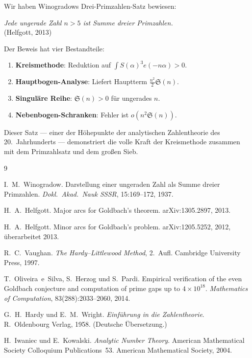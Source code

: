 \documentclass[12pt,a4paper]{amsart}
\theoremstyle{definition}
\newcommand{\eq}[1]{e\!\left(#1\right)}
\begin{document}
Wir haben Winogradows Drei-Primzahlen-Satz bewiesen:

\begin{center}
\textit{Jede ungerade Zahl $n > 5$ ist Summe dreier Primzahlen.}\\
\small (Helfgott, 2013)
\end{center}

Der Beweis hat vier Bestandteile:
\begin{enumerate}
  \item \textbf{Kreismethode}: Reduktion auf $\int S(\alpha)^3 \eq{-n\alpha} > 0$.
  \item \textbf{Hauptbogen-Analyse}: Liefert Hauptterm $\frac{n^2}{2}\mathfrak{S}(n)$.
  \item \textbf{Singuläre Reihe}: $\mathfrak{S}(n) > 0$ für ungerades $n$.
  \item \textbf{Nebenbogen-Schranken}: Fehler ist $o(n^2 \mathfrak{S}(n))$.
\end{enumerate}

Dieser Satz — einer der Höhepunkte der analytischen Zahlentheorie des
20.~Jahrhunderts — demonstriert die volle Kraft der Kreismethode
zusammen mit dem Primzahlsatz und dem großen Sieb.

\begin{thebibliography}{9}

I.~M.~Winogradow.
\newblock Darstellung einer ungeraden Zahl als Summe dreier Primzahlen.
\newblock \emph{Dokl.\ Akad.\ Nauk SSSR}, 15:169--172, 1937.

H.~A.~Helfgott.
\newblock Major arcs for Goldbach's theorem.
\newblock arXiv:1305.2897, 2013.

H.~A.~Helfgott.
\newblock Minor arcs for Goldbach's problem.
\newblock arXiv:1205.5252, 2012, überarbeitet 2013.

R.~C.~Vaughan.
\newblock \emph{The Hardy--Littlewood Method}, 2.~Aufl.
\newblock Cambridge University Press, 1997.

T.~Oliveira~e~Silva, S.~Herzog und S.~Pardi.
\newblock Empirical verification of the even Goldbach conjecture and computation
  of prime gaps up to $4 \times 10^{18}$.
\newblock \emph{Mathematics of Computation}, 83(288):2033--2060, 2014.

G.~H.~Hardy und E.~M.~Wright.
\newblock \emph{Einführung in die Zahlentheorie}.
\newblock R.~Oldenbourg Verlag, 1958. (Deutsche Übersetzung.)

H.~Iwaniec und E.~Kowalski.
\newblock \emph{Analytic Number Theory}.
\newblock American Mathematical Society Colloquium Publications~53.
\newblock American Mathematical Society, 2004.

\end{thebibliography}
\end{document}
